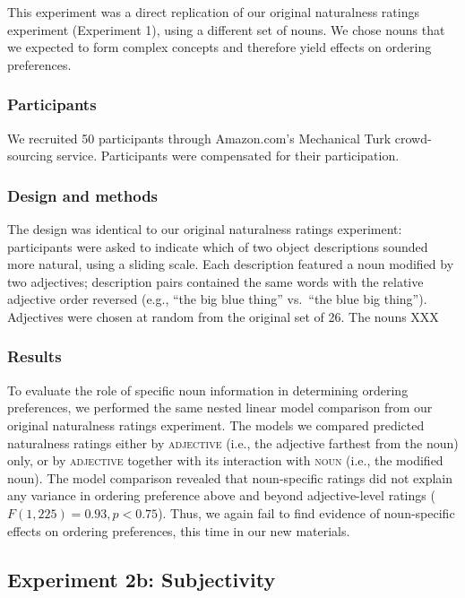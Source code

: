 \documentclass[12pt]{article}
\begin{document}
This experiment was a direct replication of our original naturalness ratings experiment (Experiment 1), using a different set of nouns. We chose nouns that we expected to form complex concepts and therefore yield effects on ordering preferences.

\subsubsection{Participants}

We recruited 50 participants through Amazon.com's Mechanical Turk crowd-sourcing service. Participants were compensated for their participation.

\subsubsection{Design and methods}

The design was identical to our original naturalness ratings experiment: participants were asked to indicate which of two object descriptions sounded more natural, using a sliding scale. Each description featured a noun modified by two adjectives; description pairs contained the same words with the relative adjective order reversed (e.g., ``the big blue thing'' vs.~``the blue big thing''). Adjectives were chosen at random from the original set of 26. The nouns XXX

\subsubsection{Results}

To evaluate the role of specific noun information in determining ordering preferences, we performed the same nested linear model comparison from our original naturalness ratings experiment. The models we compared predicted naturalness ratings either by \textsc{adjective} (i.e., the adjective farthest from the noun) only, or by \textsc{adjective} together with its interaction with \textsc{noun} (i.e., the modified noun).
The model comparison revealed that noun-specific ratings did not explain any variance in ordering preference above and beyond adjective-level ratings ($F(1,225) = 0.93, p < 0.75$).  Thus, we again fail to find evidence of noun-specific effects on ordering preferences, this time in our new materials.

\subsection{Experiment 2b: Subjectivity}
\end{document}
